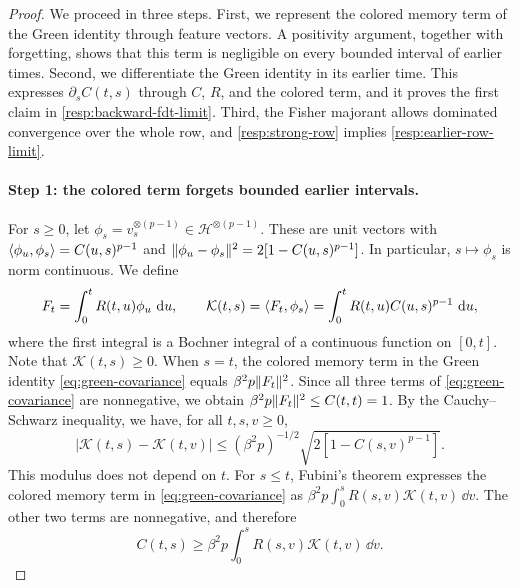\begin{proof}
We proceed in three steps. First, we represent the colored memory term of the Green identity through feature vectors. A positivity argument, together with forgetting, shows that this term is negligible on every bounded interval of earlier times. Second, we differentiate the Green identity in its earlier time. This expresses $\partial_sC(t,s)$ through $C$, $R$, and the colored term, and it proves the first claim in \eqref{resp:backward-fdt-limit}. Third, the Fisher majorant allows dominated convergence over the whole row, and \cref{resp:strong-row} implies \eqref{resp:earlier-row-limit}.

\paragraph{Step 1: the colored term forgets bounded earlier intervals.}
For $s\ge0$, let $\phi_s=v_s^{\otimes(p-1)}\in\mathcal H^{\otimes(p-1)}$. These are unit vectors with $\left\langle\phi_u,\phi_s\right\rangle=C(u,s)^{p-1}$ and $\lVert\phi_u-\phi_s\rVert^2=2[1-C(u,s)^{p-1}]$. In particular, $s\mapsto\phi_s$ is norm continuous. We define
\[
 F_t=\int_0^tR(t,u)\phi_u\,\mathop{}\!\mathrm d u,\qquad
 \mathcal K(t,s)=\left\langle F_t,\phi_s\right\rangle=\int_0^tR(t,u)C(u,s)^{p-1}\,\mathop{}\!\mathrm d u,
\]
where the first integral is a Bochner integral of a continuous function on $[0,t]$. Note that $\mathcal K(t,s)\ge0$. When $s=t$, the colored memory term in the Green identity \eqref{eq:green-covariance} equals $\beta^2p\lVert F_t\rVert^2$. Since all three terms of \eqref{eq:green-covariance} are nonnegative, we obtain $\beta^2p\lVert F_t\rVert^2\le C(t,t)=1$. By the Cauchy--Schwarz inequality, we have, for all $t,s,v\ge0$,
\begin{equation}
 |\mathcal K(t,s)-\mathcal K(t,v)|\le(\beta^2p)^{-1/2}\sqrt{2[1-C(s,v)^{p-1}]}.
 \label{resp:colored-modulus}
\end{equation}
This modulus does not depend on $t$. For $s\le t$, Fubini's theorem expresses the colored memory term in \eqref{eq:green-covariance} as $\beta^2p\int_0^sR(s,v)\mathcal K(t,v)\,\dd v$. The other two terms are nonnegative, and therefore
\begin{equation}
 C(t,s)\ge\beta^2p\int_0^sR(s,v)\mathcal K(t,v)\,\dd v.
 \label{resp:colored-test}
\end{equation}


\end{proof}
